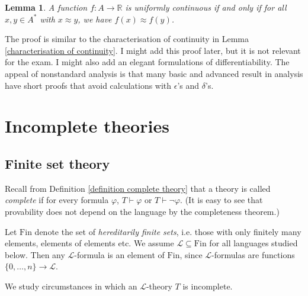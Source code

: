 \documentclass[a4paper, 11pt]{amsart}
\newtheorem{lemma}[lemma]{Lemma}
\theoremstyle{remark}
\newcommand{\Fin}{\mathrm{Fin}}
\newcommand{\RR}{\mathbb{R}}
\newcommand{\cL}{\mathcal L}
\begin{document}
\begin{lemma} 
A function $f\colon A\rightarrow \RR$ is uniformly continuous if and only if for all 
$x,y \in A^*$ with $x \approx y$, we have $f(x) \approx f(y)$. 
\end{lemma} 

The proof is similar to the characterisation of continuity in Lemma \ref{characterisation of continuity}. 
I might add this proof later, but it is not relevant for the exam. 
I might also add an elegant formulations of differentiability. 
The appeal of nonstandard analysis is that many basic and advanced result in analysis have short proofs that avoid calculations with $\epsilon$'s and $\delta$'s. 






\newpage 

\section{Incomplete theories} 



\subsection{Finite set theory} 


Recall from Definition \ref{definition complete theory} that a theory is called \emph{complete} if for every formula $\varphi$, $T\vdash \varphi$ or $T\vdash \neg\varphi$. (It is easy to see that provability does not depend on the language by the completeness theorem.) 

Let $\Fin$ denote the set of \emph{hereditarily finite sets}, i.e. those with only finitely many elements, elements of elements etc. 
We assume $\cL \subseteq \Fin$ for all languages studied below. 
Then any $\cL$-formula is an element of $\Fin$, since $\cL$-formulas are functions $\{0,\dots,n\}\rightarrow \cL$. 


We study circumstances in which an $\cL$-theory $T$ is incomplete. 
\end{document}
